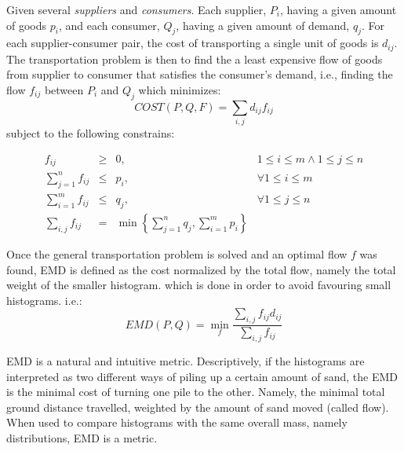 \begin{definition}
\label{def:transportation_problem}
Given several \emph{suppliers} and \emph{consumers}. 
Each supplier, $P_i$, having a given amount of goods $p_i$, and each consumer, $Q_j$, having a given amount of demand, $q_j$. 
For each supplier-consumer pair, the cost of transporting a single unit of goods is $d_{ij}$. 
The transportation problem is then to find the a least expensive flow of goods from supplier to consumer that satisfies the consumer's demand, i.e., finding the flow $f_{ij}$ between $P_i$ and $Q_j$ which minimizes:
\begin{equation}
COST(P,Q,F)=\sum_{i,j} d_{ij}f_{ij} 
\end{equation}
subject to the following constrains:

\begin{equation}
\begin{array}{lcll}
f_{ij}                       & \geq &0   , & 1\leq i \leq m \wedge 1\leq j \leq n \\
\sum\limits_{j=1}^{n} f_{ij} & \leq & p_i, & \forall 1\leq i \leq m   \\
\sum\limits_{i=1}^{m} f_{ij} & \leq & q_j, & \forall 1\leq j \leq n   \\
\sum\limits_{i,j} f_{ij}     &   =  & \min\left\{ \sum\limits_{j=1}^{n} q_j, \sum\limits_{i=1}^{m} p_i \right\} &
\end{array}
\end{equation}

\end{definition}

\iftoggle{edit-mode}{\hspace{0pt}\marginpar{EMD definition}}{}
Once the general transportation problem is solved and an optimal flow $f$ was found, EMD is defined as the cost normalized by the total flow, namely the total weight of the smaller histogram. which is done in order to avoid favouring small histograms. i.e.:
\begin{equation}
EMD(P,Q)=\min\limits_{f} {\frac{\sum_{i,j} f_{ij}d_{ij}}{\sum_{i,j} f_{ij}}}
\end{equation}

EMD is a natural and intuitive metric.
Descriptively, if the histograms are interpreted as two different ways of piling up a certain amount of sand, the EMD is the minimal cost of turning one pile to the other.
Namely, the minimal total ground distance travelled, weighted by the amount of sand moved (called flow). 
When used to compare histograms with the same overall mass, namely distributions, EMD is a metric.

